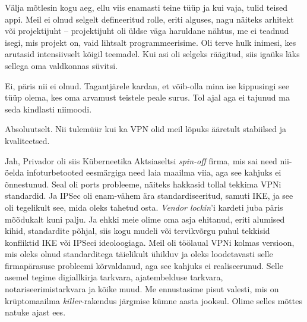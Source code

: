 
Välja mõtlesin kogu aeg, ellu viis enamasti teine tüüp ja kui vaja, tulid teised appi. Meil ei olnud selgelt defineeritud rolle, eriti alguses, nagu näiteks arhitekt või projektijuht – projektijuht oli üldse väga haruldane 
nähtus, me ei teadnud isegi, mis projekt on, vaid lihtsalt programmeerisime. Oli terve hulk inimesi, kes arutasid 
intensiivselt kõigil teemadel. Kui asi oli selgeks räägitud, siis 
igaüks läks sellega oma valdkonnas süvitsi.


Ei, päris nii ei olnud. Tagantjärele kardan, et võib-olla mina ise 
kippusingi see tüüp olema, kes oma arvamust teistele peale surus. Tol 
ajal aga ei tajunud ma seda kindlasti niimoodi. 


Absoluutselt. Nii tulemüür kui ka VPN olid meil lõpuks 
ääretult stabiilsed ja kvaliteetsed. 

Jah, Privador oli siis Küberneetika Aktsiaseltsi \emph{spin-off} 
firma, mis sai need nii-öelda infoturbetooted eesmärgiga need laia 
maailma viia, aga see kahjuks ei õnnestunud. Seal oli ports 
probleeme, näiteks hakkasid tollal tekkima VPNi
standardid. Ja IPSec oli 
enam-vähem ära standardiseeritud, samuti IKE, ja see oli 
tegelikult see, mida oleks tahetud osta. \emph{Vendor lockin}'i kardeti juba päris 
mõõdukalt kuni palju. Ja ehkki meie olime oma asja ehitanud, eriti 
alumised kihid, standardite põhjal, siis kogu mudeli või tervikvõrgu puhul tekkisid konfliktid IKE või IPSeci ideoloogiaga. Meil oli töölaual VPNi kolmas versioon, mis oleks 
olnud standarditega täielikult ühilduv ja oleks loodetavasti selle firmapärasuse 
probleemi kõrvaldanud, aga see kahjuks ei realiseerunud. 
Selle asemel tegime digiallkirja tarkvara, ajatembelduse tarkvara, 
notariseerimistarkvara ja kõike muud. Me ennustasime pisut valesti, 
mis on krüptomaailma \emph{killer}-rakendus järgmise kümne aasta jooksul. 
Olime selles mõttes natuke ajast ees.


